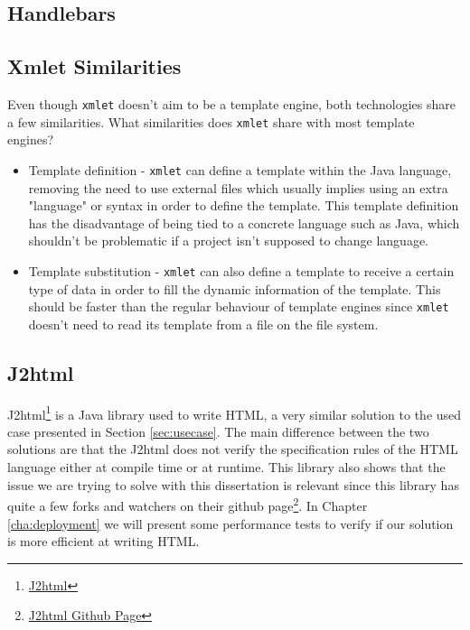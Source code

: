 \subsection{Handlebars}
\label{sec:handlebars}


\subsection{Xmlet Similarities}
\label{sec:similarities}

Even though \texttt{xmlet} doesn't aim to be a template engine, both technologies share a few similarities. What similarities does \texttt{xmlet} share with most template engines?

\begin{itemize}
	\item Template definition - \texttt{xmlet} can define a template within the Java language, removing the need to use external files which usually implies using an extra "language" or syntax in order to define the template. This template definition has the disadvantage of being tied to a concrete language such as Java, which shouldn't be problematic if a project isn't supposed to change language. 
	\item Template substitution - \texttt{xmlet} can also define a template to receive a certain type of data in order to fill the dynamic information of the template. This should be faster than the regular behaviour of template engines since \texttt{xmlet} doesn't need to read its template from a file on the file system.
\end{itemize}

\subsection{J2html} %
\label{sec:j2html}

J2html\footnote{\href{https://j2html.com/}{J2html}} is a Java library used to write \ac{HTML}, a very similar solution to the used case presented in Section \ref{sec:usecase}. The main difference between the two solutions are that the J2html does not verify the specification rules of the \ac{HTML} language either at compile time or at runtime. This library also shows that the issue we are trying to solve with this dissertation is relevant since this library has quite a few forks and watchers on their github page\footnote{\href{https://github.com/tipsy/j2html}{J2html Github Page}}. In Chapter \ref{cha:deployment} we will present some performance tests to verify if our solution is more efficient at writing \ac{HTML}. 

